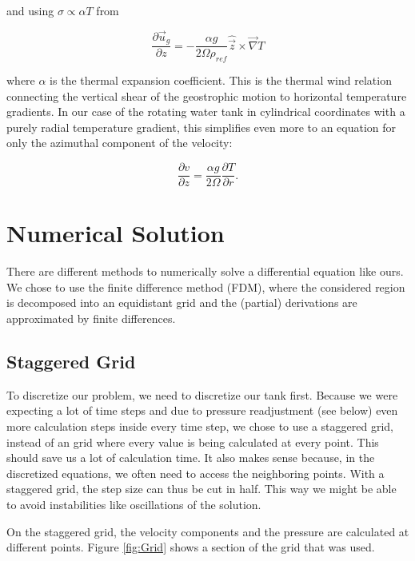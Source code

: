 \documentclass[12pt, a4paper]{article} %
\begin{document}
		and using $\sigma \propto \alpha T$ from %
		
		\begin{equation}
			\frac{\partial \vec{u}_g}{\partial z} = - \frac{\alpha g}{2\Omega \rho_{ref}} \hat{\vec{z}} \times \vec{\nabla} T
		\end{equation}
		
		where $\alpha$ is the thermal expansion coefficient. This is the thermal wind relation connecting the vertical shear of the geostrophic motion to horizontal temperature gradients. In our case of the rotating water tank in cylindrical coordinates with a purely radial temperature gradient, this simplifies even more to an equation for only the azimuthal component of the velocity:
		
		\begin{equation}
			\frac{\partial v}{\partial z} = \frac{\alpha g}{2\Omega} \frac{\partial T}{\partial r} .
			\label{eq:Thermal Wind}
		\end{equation}
		
	\newpage		
\section{Numerical Solution
}
	There are different methods to numerically solve a differential equation like ours. We chose to use the finite difference method (FDM), where the considered region is decomposed into an equidistant grid and the (partial) derivations are approximated by finite differences.
	
	
	\subsection{Staggered Grid} %
		To discretize our problem, we need to discretize our tank first. Because we were expecting a lot of time steps and due to pressure readjustment (see below) even more calculation steps inside every time step, we chose to use a staggered grid, instead of an grid where every value is being calculated at every point. This should save us a lot of calculation time. It also makes sense because, in the discretized equations, we often need to access the neighboring points. With a staggered grid, the step size can thus be cut in half. This way we might be able to avoid instabilities like oscillations of the solution.
		
		On the staggered grid, the velocity components and the pressure are calculated at different points. Figure \ref{fig:Grid} shows a section of the grid that was used.
		
\end{document}
